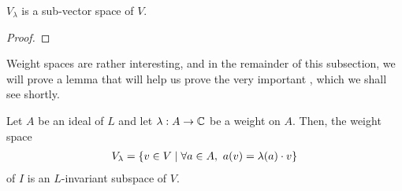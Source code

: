 \begin{lemma}
    $V_\lambda$ is a sub-vector space of $V$.
\end{lemma}
\begin{proof}
    \sorry
\end{proof}

Weight spaces are rather interesting, and in the remainder of this subsection, we will prove a lemma that will help us prove the very important , which we shall see shortly.

\begin{boxlemma}\label{Ch1:Lemma:InvarianceLemma}  %
    Let $A$ be an ideal of $L$ and let $\lambda : A \to \mathbb{C}$ be a weight on $A$. Then, the weight space
    \begin{align*}
        V_{\lambda} = \left\{ v \in V \; \middle\vert \; \forall a \in A,\ a(v) = \lambda(a) \cdot v \right\}
    \end{align*}
    of $I$ is an $L$-invariant subspace of $V$.
\end{boxlemma}
